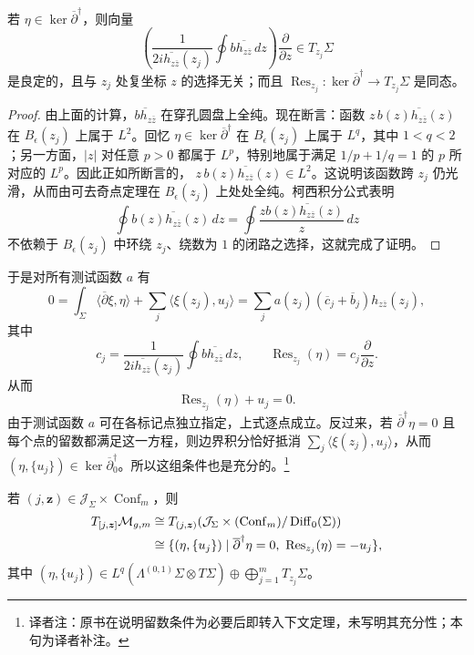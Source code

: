 \begin{proposition}\label{prop:residue-coordinate-independent}
若 $\eta\in\ker\overline\partial^\dagger$，则向量
\[
 \left(\frac1{2i \overline{h_{z\overline z}}(z_j)}
 \oint b\overline{h_{z\overline z}}\,dz\right)
 \frac\partial{\partial z}\in T_{z_j}\Sigma
\]
是良定的，且与 $z_j$ 处复坐标 $z$ 的选择无关；而且
$\operatorname{Res}_{z_j}:\ker\overline\partial^\dagger\to T_{z_j}\Sigma$
是同态。
\end{proposition}
\begin{proof}
由上面的计算，$\overline{b h_{z\overline z}}$ 在穿孔圆盘上全纯。现在断言：函数
$z\,b(z)\overline{h_{z\overline z}}(z)$ 在 $B_\epsilon(z_j)$ 上属于 $L^2$。回忆
$\eta\in\ker\overline\partial^\dagger$ 在 $B_\epsilon(z_j)$ 上属于 $L^q$，其中
$1<q<2$；另一方面，$|z|$ 对任意 $p>0$ 都属于 $L^p$，特别地属于满足
$1/p+1/q=1$ 的 $p$ 所对应的 $L^p$。因此正如所断言的，
$z\,b(z)\overline{h_{z\overline z}}(z)\in L^2$。这说明该函数跨 $z_j$ 仍光滑，从而由可去奇点定理在
$B_\epsilon(z_j)$ 上处处全纯。柯西积分公式表明
\[
 \oint b(z)\overline{h_{z\overline z}}(z)\,dz
 =\oint\frac{z b(z)\overline{h_{z\overline z}}(z)}z\,dz
\]
不依赖于 $B_\epsilon(z_j)$ 中环绕 $z_j$、绕数为 $1$ 的闭路之选择，这就完成了证明。
\end{proof}

于是对所有测试函数 $a$ 有
\[
 0=\int_\Sigma\langle\overline\partial\xi,\eta\rangle
 +\sum_j\langle\xi(z_j),u_j\rangle
 =\sum_j a(z_j)(\overline c_j+\overline b_j)h_{z\overline z}(z_j),
\]
其中
\[
 c_j=\frac1{2i\overline{h_{z\overline z}}(z_j)}
 \oint b\overline{h_{z\overline z}}\,dz,
 \qquad
 \operatorname{Res}_{z_j}(\eta)=c_j\frac\partial{\partial z}.
\]
从而
\[
 \operatorname{Res}_{z_j}(\eta)+u_j=0.
\]
由于测试函数 $a$ 可在各标记点独立指定，上式逐点成立。反过来，若
$\overline\partial^\dagger\eta=0$ 且每个点的留数都满足这一方程，则边界积分恰好抵消
$\sum_j\langle\xi(z_j),u_j\rangle$，从而
$(\eta,\{u_j\})\in\ker\overline\partial_0^\dagger$。所以这组条件也是充分的。\footnote{译者注：原书在说明留数条件为必要后即转入下文定理，未写明其充分性；本句为译者补注。}

\begin{theorem}\label{thm:tangent-marked-moduli-residue}
若 $(j,\boldsymbol z)\in\mathcal J_\Sigma\times\operatorname{Conf}_m$，则
\[
 \begin{split}
 T_{[j,\boldsymbol z]}\mathcal M_{g,m}
 &\cong T_{(j,\boldsymbol z)}
 (\mathcal J_\Sigma\times(\operatorname{Conf}_m)/\operatorname{Diff}_0(\Sigma))\\
 &\cong\{(\eta,\{u_j\})\mid
 \overline\partial^\dagger\eta=0,
 \ \operatorname{Res}_{z_j}(\eta)=-u_j\},
 \end{split}
\]
其中 $(\eta,\{u_j\})\in L^q(\Lambda^{(0,1)}\Sigma\otimes T\Sigma)
\oplus\bigoplus_{j=1}^mT_{z_j}\Sigma$。
\end{theorem}

